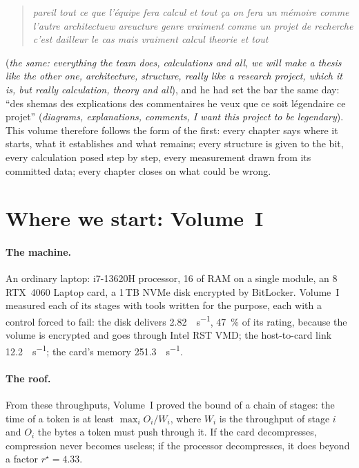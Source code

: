 \begin{quote}\itshape
pareil tout ce que l'équipe fera calcul et tout ça on fera un mémoire comme l'autre architectuew areucture genre vraiment comme un projet de recherche c'est dailleur le cas mais vraiment calcul theorie et tout
\end{quote}

(\emph{the same: everything the team does, calculations and all, we will make a thesis like the other one, architecture, structure, really like a research project, which it is, but really calculation, theory and all}), and he had set the bar the same day: ``des shemas des explications des commentaires he veux que ce soit légendaire ce projet'' (\emph{diagrams, explanations, comments, I want this project to be legendary}). This volume therefore follows the form of the first: every chapter says where it starts, what it establishes and what remains; every structure is given to the bit, every calculation posed step by step, every measurement drawn from its committed data; every chapter closes on what could be wrong.

\section{Where we start: Volume~I}\label{t2i-sec:tome1}

\paragraph{The machine.} An ordinary laptop: i7-13620H processor, \SI{16}{\Go} of RAM on a single module, an \SI{8}{\Go} RTX~4060 Laptop card, a 1\,TB NVMe disk encrypted by BitLocker. Volume~I measured each of its stages with tools written for the purpose, each with a control forced to fail: the disk delivers \SI{2.82}{\Go\per\second}, \SI{47}{\percent} of its rating, because the volume is encrypted and goes through Intel RST VMD; the host-to-card link \SI{12.2}{\Go\per\second}; the card's memory \SI{251.3}{\Go\per\second}.

\paragraph{The roof.} From these throughputs, Volume~I proved the bound of a chain of stages: the time of a token is at least $\max_i O_i / W_i$, where $W_i$ is the throughput of stage $i$ and $O_i$ the bytes a token must push through it. If the card decompresses, compression never becomes useless; if the processor decompresses, it does beyond a factor $r^\star = 4.33$.

